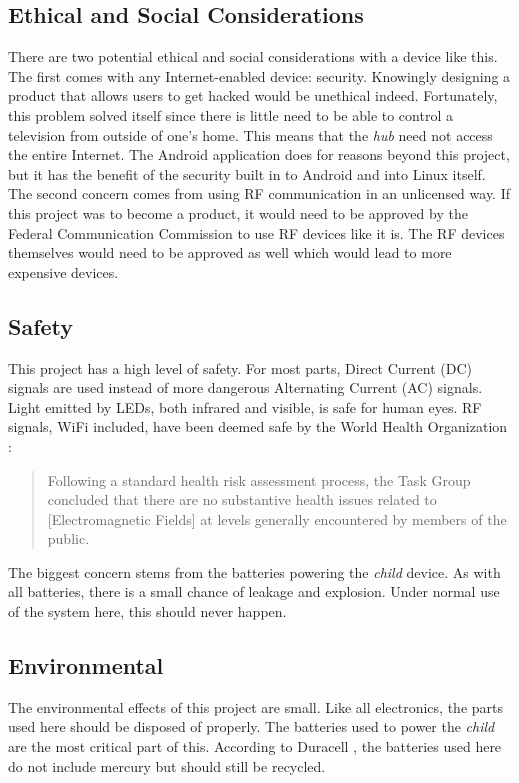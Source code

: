 \documentclass[12pt]{article}
\begin{document}
\subsection*{Ethical and Social Considerations}
There are two potential ethical and social considerations with a device like this. The first comes with any Internet-enabled device: security. Knowingly designing a product that allows users to get hacked would be unethical indeed. Fortunately, this problem solved itself since there is little need to be able to control a television from outside of one's home. This means that the \emph{hub} need not access the entire Internet. The Android application does for reasons beyond this project, but it has the benefit of the security built in to Android and into Linux itself. The second concern comes from using RF communication in an unlicensed way. If this project was to become a product, it would need to be approved by the Federal Communication Commission to use RF devices like it is. The RF devices themselves would need to be approved as well which would lead to more expensive devices. 

\subsection*{Safety}
This project has a high level of safety. For most parts, Direct Current (DC) signals are used instead of more dangerous Alternating Current (AC) signals. Light emitted by LEDs, both infrared and visible, is safe for human eyes. RF signals, WiFi included, have been deemed safe by the World Health Organization \cite{who}:
\begin{quote}
Following a standard health risk assessment process, the Task Group concluded that there are no substantive health issues related to [Electromagnetic Fields] at levels generally encountered by members of the public.
\end{quote}
 The biggest concern stems from the batteries powering the \emph{child} device. As with all batteries, there is a small chance of leakage and explosion. Under normal use of the system here, this should never happen.

\subsection*{Environmental}
The environmental effects of this project are small. Like all electronics, the parts used here should be disposed of properly. The batteries used to power the \emph{child} are the most critical part of this. According to Duracell \cite{duracell}, the batteries used here do not include mercury but should still be recycled. 
\end{document}
